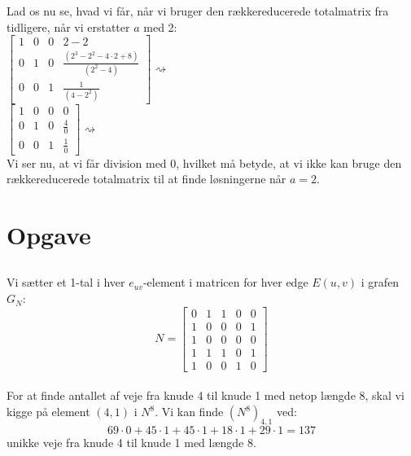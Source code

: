 \documentclass[a4paper,12pt]{article}
\begin{document}
Lad os nu se, hvad vi får, når vi bruger den rækkereducerede totalmatrix fra tidligere, når vi erstatter $a$ med 2:\\

$\left[\begin{array}{ccc|c}
    1 & 0 & 0 & 2-2 \\
    0 & 1 & 0 & \frac{(2^3 - 2^2 - 4\cdot 2 + 8)}{(2^2 - 4)} \\
    0 & 0 & 1 & \frac{1}{(4-2^2)}
\end{array}\right]
\rightsquigarrow$\\

$\left[\begin{array}{ccc|c}
    1 & 0 & 0 & 0 \\
    0 & 1 & 0 & \frac{4}{0} \\
    0 & 0 & 1 & \frac{1}{0}
\end{array}\right]
\rightsquigarrow$\\

Vi ser nu, at vi får division med 0, hvilket må betyde, at vi ikke kan bruge den rækkereducerede totalmatrix til at finde løsningerne når $a=2$.\\

\subsection{}


\section[Opgave]{Opgave}
\subsection{}
Vi sætter et 1-tal i hver $e_{uv}$-element i matricen for hver edge $E(u,v)$ i grafen $G_N$:\\

\[
N = 
\left[\begin{array}{ccccc}
    0 & 1 & 1 & 0 & 0 \\
    1 & 0 & 0 & 0 & 1 \\
    1 & 0 & 0 & 0 & 0 \\
    1 & 1 & 1 & 0 & 1 \\
    1 & 0 & 0 & 1 & 0 
\end{array}\right]
\]\\

For at finde antallet af veje fra knude 4 til knude 1 med netop længde 8, skal vi kigge på element $(4,1)$ i $N^8$. Vi kan finde $(N^8)_{4,1}$ ved:\\
\[
69 \cdot 0 + 45 \cdot 1 + 45 \cdot 1 + 18 \cdot 1 + 29 \cdot 1 = 137
\]
unikke veje fra knude 4 til knude 1 med længde 8.\\
\end{document}
